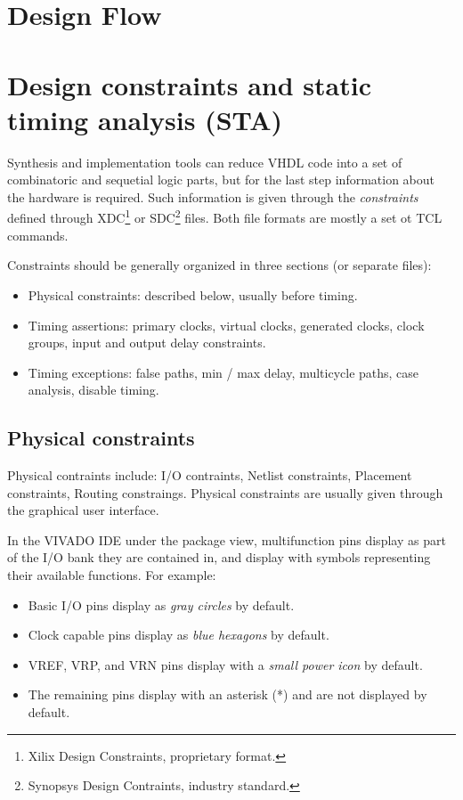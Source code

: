 \documentclass[margin=small]{tex/hsrzf}
\begin{document}
\section{Design Flow}

\section{Design constraints and static timing analysis (STA)}

Synthesis and implementation tools can reduce VHDL code into a set of combinatoric and sequetial logic parts, but for the last step information about the hardware is required. Such information is given through the \emph{constraints} defined through XDC\footnote{Xilix Design Constraints, proprietary format.}  or SDC\footnote{Synopsys Design Contraints, industry standard.} files. Both file formats are mostly a set ot TCL commands.

Constraints should be generally organized in three sections (or separate files):
\begin{itemize}
  \item Physical constraints: described below, usually before timing.
  \item Timing assertions: primary clocks, virtual clocks, generated clocks, clock groups, input and output delay constraints.
  \item Timing exceptions: false paths, min / max delay, multicycle paths, case analysis, disable timing.
\end{itemize}

\subsection{Physical constraints}

Physical contraints include: I/O contraints, Netlist constraints, Placement constraints, Routing constraings. Physical constraints are usually given through the graphical user interface.

In the VIVADO IDE under the package view, multifunction pins display as part of the I/O bank they are contained in, and display with symbols representing their available functions. For example:
\begin{itemize}
  \item Basic I/O pins display as \emph{gray circles} by default.
  \item Clock capable pins display as \emph{blue hexagons} by default.
  \item VREF, VRP, and VRN pins display with a \emph{small power icon} by default.
  \item The remaining pins display with an asterisk (*) and are not displayed by default.
\end{itemize}
\end{document}
